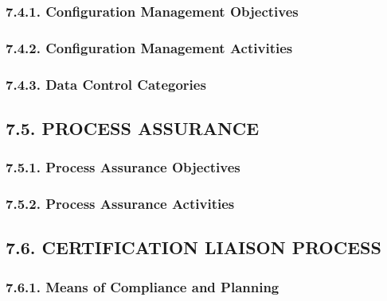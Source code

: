 \documentclass[
]{article}
\begin{document}
\hypertarget{configuration-management-objectives-1}{%
\subsubsection{7.4.1. Configuration Management
Objectives}\label{configuration-management-objectives-1}}

\hypertarget{configuration-management-activities-1}{%
\subsubsection{7.4.2. Configuration Management
Activities}\label{configuration-management-activities-1}}

\hypertarget{data-control-categories-1}{%
\subsubsection{7.4.3. Data Control
Categories}\label{data-control-categories-1}}

\hypertarget{process-assurance-1}{%
\subsection{7.5. PROCESS ASSURANCE}\label{process-assurance-1}}

\hypertarget{process-assurance-objectives-1}{%
\subsubsection{7.5.1. Process Assurance
Objectives}\label{process-assurance-objectives-1}}

\hypertarget{process-assurance-activities-1}{%
\subsubsection{7.5.2. Process Assurance
Activities}\label{process-assurance-activities-1}}

\hypertarget{certification-liaison-process-1}{%
\subsection{7.6. CERTIFICATION LIAISON
PROCESS}\label{certification-liaison-process-1}}

\hypertarget{means-of-compliance-and-planning-1}{%
\subsubsection{7.6.1. Means of Compliance and
Planning}\label{means-of-compliance-and-planning-1}}
\end{document}
